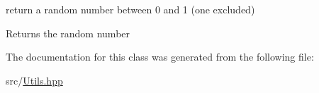return a random number between 0 and 1 (one excluded) 

\begin{DoxyReturn}{Returns}
the random number 
\end{DoxyReturn}


The documentation for this class was generated from the following file\+:\begin{DoxyCompactItemize}
\item 
src/\hyperlink{Utils_8hpp}{Utils.\+hpp}\end{DoxyCompactItemize}
